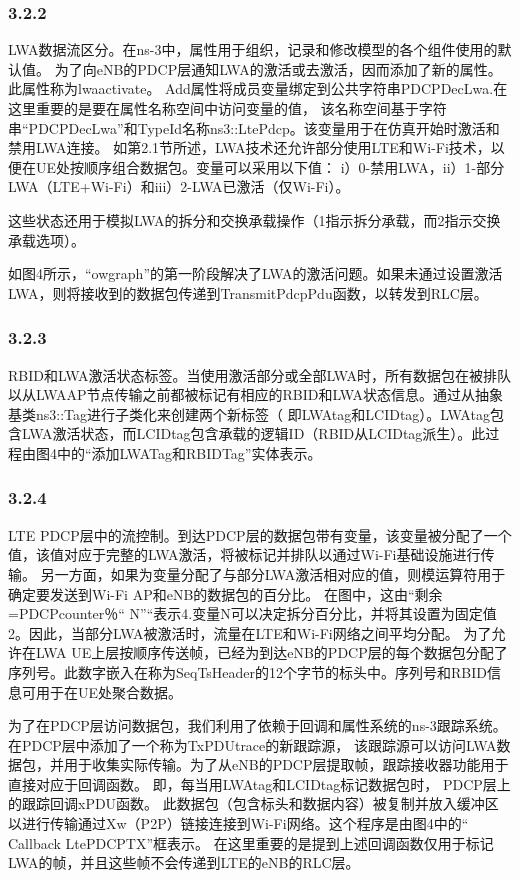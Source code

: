 \subsubsection*{3.2.2}
LWA数据流区分。在ns-3中，属性用于组织，记录和修改模型的各个组件使用的默认值。
为了向eNB的PDCP层通知LWA的激活或去激活，因而添加了新的属性。此属性称为lwaactivate。
Add属性将成员变量绑定到公共字符串PDCPDecLwa.在这里重要的是要在属性名称空间中访问变量的值，
该名称空间基于字符串“PDCPDecLwa”和TypeId名称ns3::LtePdcp。该变量用于在仿真开始时激活和禁用LWA连接。
如第2.1节所述，LWA技术还允许部分使用LTE和Wi-Fi技术，以便在UE处按顺序组合数据包。变量可以采用以下值：
i）0-禁用LWA，ii）1-部分LWA（LTE+Wi-Fi）和iii）2-LWA已激活（仅Wi-Fi）。

这些状态还用于模拟LWA的拆分和交换承载操作（1指示拆分承载，而2指示交换承载选项）。

如图4所示，“owgraph”的第一阶段解决了LWA的激活问题。如果未通过设置激活LWA，则将接收到的数据包传递到TransmitPdcpPdu函数，以转发到RLC层。

\subsubsection*{3.2.3}
RBID和LWA激活状态标签。当使用激活部分或全部LWA时，所有数据包在被排队以从LWAAP节点传输之前都被标记有相应的RBID和LWA状态信息。通过从抽象基类ns3::Tag进行子类化来创建两个新标签（
即LWAtag和LCIDtag）。LWAtag包含LWA激活状态，而LCIDtag包含承载的逻辑ID（RBID从LCIDtag派生）。此过程由图4中的“添加LWATag和RBIDTag”实体表示。

\subsubsection*{3.2.4}
LTE PDCP层中的流控制。到达PDCP层的数据包带有变量，该变量被分配了一个值，该值对应于完整的LWA激活，将被标记并排队以通过Wi-Fi基础设施进行传输。
另一方面，如果为变量分配了与部分LWA激活相对应的值，则模运算符用于确定要发送到Wi-Fi AP和eNB的数据包的百分比。
在图中，这由“剩余=PDCPcounter％“ N”“表示4.变量N可以决定拆分百分比，并将其设置为固定值2。因此，当部分LWA被激活时，流量在LTE和Wi-Fi网络之间平均分配。
为了允许在LWA UE上层按顺序传送帧，已经为到达eNB的PDCP层的每个数据包分配了序列号。此数字嵌入在称为SeqTsHeader的12个字节的标头中。序列号和RBID信息可用于在UE处聚合数据。

为了在PDCP层访问数据包，我们利用了依赖于回调和属性系统的ns-3跟踪系统。在PDCP层中添加了一个称为TxPDUtrace的新跟踪源，
该跟踪源可以访问LWA数据包，并用于收集实际传输。为了从eNB的PDCP层提取帧，跟踪接收器功能用于直接对应于回调函数。
即，每当用LWAtag和LCIDtag标记数据包时，
PDCP层上的跟踪回调xPDU函数。
此数据包（包含标头和数据内容）被复制并放入缓冲区以进行传输通过Xw（P2P）链接连接到Wi-Fi网络。这个程序是由图4中的“ Callback LtePDCPTX”框表示。
在这里重要的是提到上述回调函数仅用于标记LWA的帧，并且这些帧不会传递到LTE的eNB的RLC层。

